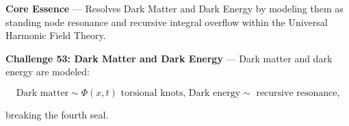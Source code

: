 
\textbf{Core Essence} --- Resolves Dark Matter and Dark Energy by modeling them as standing node resonance and recursive integral overflow within the Universal Harmonic Field Theory.

\textbf{Challenge 53: Dark Matter and Dark Energy} --- Dark matter and dark energy are modeled:

$$
\text{Dark matter} \sim \Phi(x, t) \text{ torsional knots, Dark energy} \sim \text{ recursive resonance,}
$$

breaking the fourth seal.

